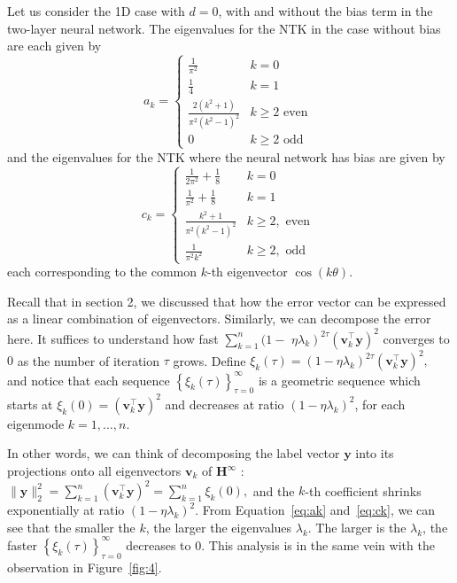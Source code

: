 \documentclass[letterpaper,12pt]{article}
\begin{document}
Let us consider the 1D case with $d=0$, with and without the bias term in the two-layer neural network. The eigenvalues for the NTK in the case without bias are each given by
\begin{equation}
a_{k}=\left\{\begin{array}{ll}
\frac{1}{\pi^{2}} & k=0 \\
\frac{1}{4} & k=1 \\
\frac{2\left(k^{2}+1\right)}{\pi^{2}\left(k^{2}-1\right)^{2}} & k \geq 2 \text { even } \\
0 & k \geq 2 \text { odd }
\end{array}\right.\label{eq:ak}
\end{equation}
and the eigenvalues for the NTK where the neural network has bias are given by
\begin{equation}
c_{k}=\left\{\begin{array}{ll}
\frac{1}{2 \pi^{2}}+\frac{1}{8} & k=0 \\
\frac{1}{\pi^{2}}+\frac{1}{8} & k=1 \\
\frac{k^{2}+1}{\pi^{2}\left(k^{2}-1\right)^{2}} & k \geq 2 , \text { even } \\
\frac{1}{\pi^{2} k^{2}} & k \geq 2 , \text { odd }
\end{array}\right.\label{eq:ck}
\end{equation}
each corresponding to the common $k$-th eigenvector $\cos (k \theta)$.

Recall that in section 2, we discussed that how the error vector can be expressed as a linear combination of eigenvectors. Similarly, we can decompose the error here. It suffices to understand how fast $\sum_{k=1}^{n}(1-$ $\left.\eta \lambda_{k}\right)^{2 \tau}\left(\mathbf{v}_{k}^{\top} \mathbf{y}\right)^{2}$ converges to $0$ as the number of iteration $\tau$ grows. Define $\xi_{k}(\tau)=\left(1-\eta \lambda_{k}\right)^{2 \tau}\left(\mathbf{v}_{k}^{\top} \mathbf{y}\right)^{2},$ and notice that each sequence $\left\{\xi_{k}(\tau)\right\}_{\tau=0}^{\infty}$ is a geometric sequence which starts at $\xi_{k}(0)=\left(\mathbf{v}_{k}^{\top} \mathbf{y}\right)^{2}$ and decreases at ratio $\left(1-\eta \lambda_{k}\right)^{2}$, for each eigenmode $k = 1,\ldots,n$. 

In other words, we can think of decomposing the label vector $\mathbf{y}$ into its projections onto all eigenvectors $\mathbf{v}_{k}$ of $\mathbf{H}^{\infty}$ :
$\|\mathbf{y}\|_{2}^{2}=\sum_{k=1}^{n}\left(\mathbf{v}_{k}^{\top} \mathbf{y}\right)^{2}=\sum_{k=1}^{n} \xi_{k}(0),$ and the $k$-th coefficient
shrinks exponentially at ratio $\left(1-\eta \lambda_{k}\right)^{2} .$ From Equation~\eqref{eq:ak} and~\eqref{eq:ck}, we can see that the smaller the $k$, the larger the eigenvalues $\lambda_{k}$. The larger is the $\lambda_{k}$, the faster $\left\{\xi_{k}(\tau)\right\}_{\tau=0}^{\infty}$ decreases to $0.$ This analysis is in the same vein with the observation in Figure~\eqref{fig:4}.
\end{document}
